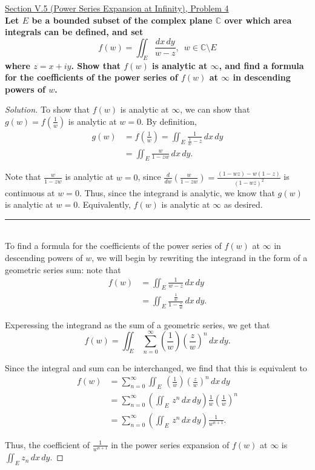 \documentclass[11pt]{article}
\newcommand{\C}{\mathbb{C}}
\newcommand{\Sum}{\sum\limits_{n=0}^{\infty}}
\newenvironment{solution}
  {\renewcommand\qedsymbol{$\blacksquare$}\begin{proof}[Solution]}
  {\end{proof}}
\theoremstyle{definition}
\begin{document}
\underline{Section V.5 (Power Series Expansion at Infinity), Problem 4} \\

\textbf{Let $E$ be a bounded subset of the complex plane $\C$ over which area integrals can be defined, and set}
\[ f(w) = \iint_{E} \frac{dx \, dy}{w-z}, \, \, \, w \in \C \setminus E \]
\textbf{where $z = x+iy$. Show that $f(w)$ is analytic at $\infty$, and find a formula for the coefficients of the power series of $f(w)$ at 
$\infty$ in descending powers of $w$.}

\begin{solution}
To show that $f(w)$ is analytic at $\infty$, we can show that $g(w) = f\left(\frac{1}{w}\right)$ is analytic at $w = 0$. By definition,
\begin{align*} g(w) &= f\left(\frac{1}{w}\right) = \iint_E \frac{1}{\frac{1}{w} - z} \, dx \, dy \\
&= \iint_E \frac{w}{1-zw} \, dx \, dy.\end{align*}

Note that $\frac{w}{1-zw}$ is analytic at $w = 0$, since $\frac{d}{dw} \left(\frac{w}{1-zw}\right) = \frac{(1-wz) - w(1-z)}{(1-wz)^2}$ is continuous at $w=0$. Thus, since the integrand is analytic, we know that $g(w)$ is analytic at $w=0$. 
Equivalently, $f(w)$ is analytic at $\infty$ as desired. 

\noindent\rule{\textwidth}{1pt} \\

To find a formula for the coefficients of the power series of $f(w)$ at $\infty$ in descending powers of $w$, we will begin by rewriting the integrand in the form
of a geometric series sum: note that
\begin{align*} f(w) &= \iint_{E} \frac{1}{w-z} \, dx \, dy \\
&= \iint_{E} \frac{\frac{1}{w}}{1 - \frac{z}{w}} \, dx \, dy. \end{align*}

Experessing the integrand as the sum of a geometric series, we get that 
\[ f(w) = \iint_{E} \, \Sum \left(\frac{1}{w}\right)\left(\frac{z}{w}\right)^n \, dx \, dy. \]

Since the integral and sum can be interchanged, we find that this is equivalent to
\begin{align*} f(w) &= \Sum \iint_{E} \, \left(\frac{1}{w}\right)\left(\frac{z}{w}\right)^n \, dx \, dy \\
&= \Sum \left(\iint_{E} \, z^n \, dx \, dy \right)\frac{1}{w} \left(\frac{1}{w}\right)^n \\
&= \Sum \left(\iint_{E} \, z^n \, dx \, dy \right) \frac{1}{w^{n+1}}.  \end{align*}

Thus, the coefficient of $\frac{1}{w^{n+1}}$ in the power series expansion of $f(w)$ at $\infty$ is $\boxed{\iint_E z_n \, dx \, dy}$.
\end{solution}
\end{document}
